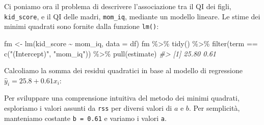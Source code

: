\documentclass[
  11pt,
]{krantz}
\makeatletter
\newenvironment{Shaded}{\begin{snugshade}}{\end{snugshade}}
\newcommand{\AttributeTok}[1]{\textcolor[rgb]{0.61,0.61,0.61}{#1}}
\newcommand{\CommentTok}[1]{\textcolor[rgb]{0.37,0.37,0.37}{\textit{#1}}}
\newcommand{\DecValTok}[1]{\textcolor[rgb]{0.06,0.06,0.06}{#1}}
\newcommand{\FloatTok}[1]{\textcolor[rgb]{0.06,0.06,0.06}{#1}}
\newcommand{\FunctionTok}[1]{\textcolor[rgb]{0,0,0}{#1}}
\newcommand{\NormalTok}[1]{#1}
\newcommand{\OtherTok}[1]{\textcolor[rgb]{0.37,0.37,0.37}{#1}}
\newcommand{\SpecialCharTok}[1]{\textcolor[rgb]{0,0,0}{#1}}
\newcommand{\StringTok}[1]{\textcolor[rgb]{0.5,0.5,0.5}{#1}}
\newenvironment{kframe}{%
\medskip{}
\setlength{\fboxsep}{.8em}
 \def\at@end@of@kframe{}%
 \ifinner\ifhmode%
  \def\at@end@of@kframe{\end{minipage}}%
  \begin{minipage}{\columnwidth}%
 \fi\fi%
 \def\FrameCommand##1{\hskip\@totalleftmargin \hskip-\fboxsep
 \colorbox{shadecolor}{##1}\hskip-\fboxsep
     \hskip-\linewidth \hskip-\@totalleftmargin \hskip\columnwidth}%
 \MakeFramed {\advance\hsize-\width
   \@totalleftmargin\z@ \linewidth\hsize
   \@setminipage}}%
 {\par\unskip\endMakeFramed%
 \at@end@of@kframe}
\renewenvironment{Shaded}{\begin{kframe}}{\end{kframe}}
\theoremstyle{definition}
\theoremstyle{definition}
\theoremstyle{definition}
\theoremstyle{definition}
\theoremstyle{remark}
\makeatother
\begin{document}
Ci poniamo ora il problema di descrivere l'associazione tra il QI dei figli, \texttt{kid\_score}, e il QI delle madri, \texttt{mom\_iq}, mediante un modello lineare. Le stime dei minimi quadrati sono fornite dalla funzione \texttt{lm()}:

\begin{Shaded}
\begin{Highlighting}[]
\NormalTok{fm }\OtherTok{\textless{}{-}} \FunctionTok{lm}\NormalTok{(kid\_score }\SpecialCharTok{\textasciitilde{}}\NormalTok{ mom\_iq, }\AttributeTok{data =}\NormalTok{ df)}
\NormalTok{fm }\SpecialCharTok{\%\textgreater{}\%}
  \FunctionTok{tidy}\NormalTok{() }\SpecialCharTok{\%\textgreater{}\%}
  \FunctionTok{filter}\NormalTok{(term }\SpecialCharTok{==} \FunctionTok{c}\NormalTok{(}\StringTok{"(Intercept)"}\NormalTok{, }\StringTok{"mom\_iq"}\NormalTok{)) }\SpecialCharTok{\%\textgreater{}\%}
  \FunctionTok{pull}\NormalTok{(estimate)}
\CommentTok{\#\textgreater{} [1] 25.80  0.61}
\end{Highlighting}
\end{Shaded}

\noindent Calcoliamo la somma dei residui quadratici in base al modello di regressione \(\hat{y}_i = 25.8 + 0.61 x_i\):

\begin{Shaded}
\end{Shaded}

Per sviluppare una comprensione intuitiva del metodo dei minimi quadrati, esploriamo i valori assunti da \texttt{rss} per diversi valori di \(a\) e \(b\). Per semplicità, manteniamo costante \texttt{b\ =\ 0.61} e variamo i valori \texttt{a}.

\begin{Shaded}
\end{Shaded}
\end{document}

